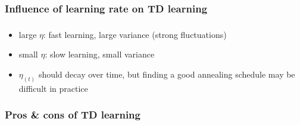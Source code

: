 \subsubsection{Influence of learning rate on TD learning}

\begin{frame}\frametitle{\subsubsecname}


	
\pause

	\begin{itemize}
		\item { large $\eta$: 
			fast learning, large variance (strong fluctuations)}
		\vspace{1mm}
		\item { small $\eta$: 
			slow learning, small variance}
		\vspace{1mm}
		\item { $\eta_{(t)}$ should decay over time, but finding a good annealing schedule may be difficult in practice}
	\end{itemize}

\end{frame}

\subsubsection{Pros \& cons of TD learning}

